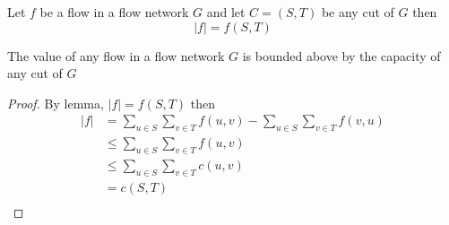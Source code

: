 \documentclass[11pt]{article}
\begin{document}
\begin{lemma*}
  Let $f$ be a flow in a flow network $G$ and let $C = (S,T)$ be any cut of $G$ then
  \[
    |f| = f(S,T)
  \]
\end{lemma*}

\begin{corollary*}
  The value of any flow in a flow network $G$ is bounded above by the capacity of any cut of $G$
  \begin{proof}
    By lemma, $|f| = f(S,T)$ then
    \begin{align*}
      |f| &= \sum_{u\in S}\sum_{v\in T} f(u,v) -  \sum_{u\in S}\sum_{v\in T} f(v,u)\\
      &\leq \sum_{u\in S}\sum_{v\in T} f(u,v)\\
      &\leq \sum_{u\in S}\sum_{v\in T} c(u,v)\\
      &= c(S,T)\\
    \end{align*}
  \end{proof}
\end{corollary*}
\end{document}
